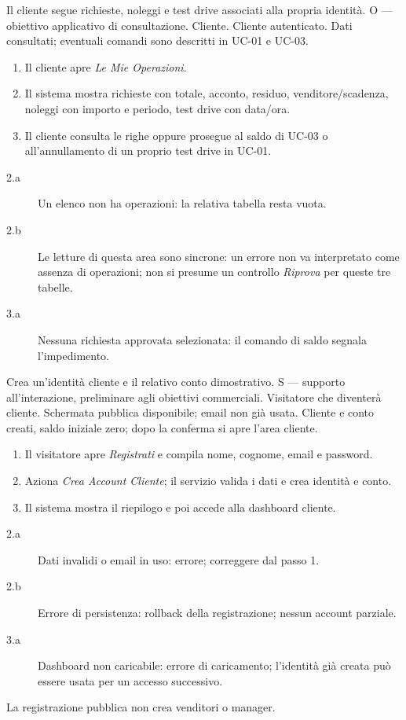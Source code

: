 \clearpage
{}
{Il cliente segue richieste, noleggi e test drive associati alla propria identit\`a.}
{O --- obiettivo applicativo di consultazione.}
{Cliente.}
{Cliente autenticato.}
{Dati consultati; eventuali comandi sono descritti in UC-01 e UC-03.}
\principale
\begin{enumerate}
\item Il cliente apre \emph{Le Mie Operazioni}.
\item Il sistema mostra richieste con totale, acconto, residuo, venditore/scadenza,
  noleggi con importo e periodo, test drive con data/ora.
\item Il cliente consulta le righe oppure prosegue al saldo di UC-03
  o all'annullamento di un proprio test drive in UC-01.
\end{enumerate}
\alternative
\begin{description}
\item[2.a] Un elenco non ha operazioni: la relativa tabella resta vuota.
\item[2.b] Le letture di questa area sono sincrone: un errore non va interpretato
  come assenza di operazioni; non si presume un controllo \emph{Riprova} per queste tre tabelle.
\item[3.a] Nessuna richiesta approvata selezionata: il comando di saldo segnala l'impedimento.
\end{description}

{Crea un'identit\`a cliente e il relativo conto dimostrativo.}
{S --- supporto all'interazione, preliminare agli obiettivi commerciali.}
{Visitatore che diventer\`a cliente.}
{Schermata pubblica disponibile; email non gi\`a usata.}
{Cliente e conto creati, saldo iniziale zero; dopo la conferma si apre l'area cliente.}
\principale
\begin{enumerate}
\item Il visitatore apre \emph{Registrati} e compila nome, cognome, email e password.
\item Aziona \emph{Crea Account Cliente}; il servizio valida i dati e crea identit\`a e conto.
\item Il sistema mostra il riepilogo e poi accede alla dashboard cliente.
\end{enumerate}
\alternative
\begin{description}
\item[2.a] Dati invalidi o email in uso: errore; correggere dal passo 1.
\item[2.b] Errore di persistenza: rollback della registrazione; nessun account parziale.
\item[3.a] Dashboard non caricabile: errore di caricamento;
  l'identit\`a gi\`a creata pu\`o essere usata per un accesso successivo.
\end{description}
\noindent La registrazione pubblica non crea venditori o manager.

